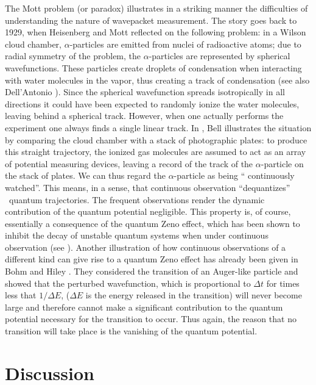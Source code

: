 \documentclass[12pt]{article}%
\begin{document}
The Mott problem (or paradox) illustrates in a striking manner the
difficulties of understanding the nature of wavepacket measurement. The story
goes back to 1929, when Heisenberg and Mott \cite{Mott,Hbg} reflected on the
following problem: in a Wilson cloud chamber, $\alpha$-particles are emitted
from nuclei of radioactive atoms; due to radial symmetry of the problem, the
$\alpha$-particles are represented by spherical wavefunctions. These particles
create droplets of condensation when interacting with water molecules in the
vapor, thus creating a track of condensation (see also Dell'Antonio
\cite{dell}). Since the spherical wavefunction spreads isotropically in all
directions it could have been expected to randomly ionize the water molecules,
leaving behind a spherical track. However, when one actually performs the
experiment one always finds a single linear track. In \cite{Bell}, Bell
illustrates the situation by comparing the cloud chamber with a stack of
photographic plates: to produce this straight trajectory, the ionized gas
molecules are assumed to act as an array of potential measuring devices,
leaving a record of the track of the $\alpha$-particle on the stack of plates.
We can thus regard the $\alpha$-particle as being \textquotedblleft
continuously watched\textquotedblright. This means, in a sense, that
continuous observation \textquotedblleft dequantizes\textquotedblright%
\ quantum trajectories. The frequent observations render the dynamic
contribution of the quantum potential negligible. This property is, of course,
essentially a consequence of the quantum Zeno effect, which has been shown to
inhibit the decay of unstable quantum systems when under continuous
observation (see \cite{BoHi, fapa09,gux,Hannabuss}). Another illustration of
how continuous observations of a different kind can give rise to a quantum
Zeno effect has already been given in Bohm and Hiley \cite{BoHi}. They
considered the transition of an Auger-like particle and showed that the
perturbed wavefunction, which is proportional to $\Delta t$ for times less
that $1/\Delta E$, ($\Delta E$ is the energy released in the transition) will
never become large and therefore cannot make a significant contribution to the
quantum potential necessary for the transition to occur. Thus again, the
reason that no transition will take place is the vanishing of the quantum potential.

\section{Discussion}
\end{document}
